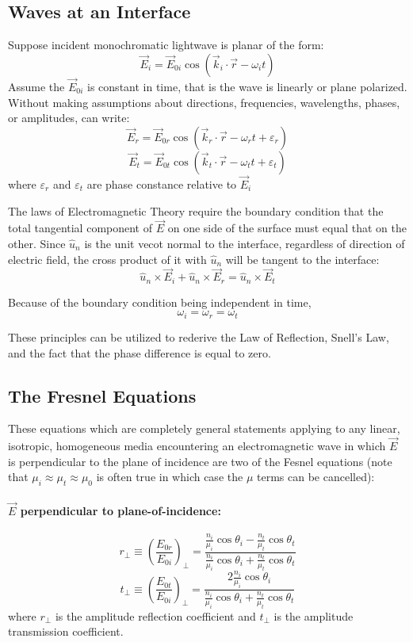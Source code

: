 \documentclass[12pt]{report}
\begin{document}
\subsection{Waves at an Interface}
Suppose incident monochromatic lightwave is planar of the form:
\[\vec{E}_i = \vec{E}_{0i}\cos (\vec{k}_i\cdot\vec{r}-\omega_i t)\]
Assume the $\vec{E}_{0i}$ is constant in time, that is the wave is linearly or plane polarized. Without making assumptions about directions, frequencies, wavelengths, phases, or amplitudes, can write:
\[\vec{E}_r = \vec{E}_{0r}\cos (\vec{k}_r\cdot\vec{r}-\omega_r t+\varepsilon_r)\]
\[\vec{E}_t = \vec{E}_{0t}\cos (\vec{k}_t\cdot\vec{r}-\omega_t t+\varepsilon_t)\]
where $\varepsilon_r$ and $\varepsilon_t$ are phase constance relative to $\vec{E}_i$

The laws of Electromagnetic Theory require the boundary condition that the total tangential component of $\vec{E}$ on one side of the surface must equal that on the other. Since $\hat{u}_n$ is the unit vecot normal to the interface, regardless of direction of electric field, the cross product of it with $\hat{u}_n$ will be tangent to the interface:
\[\hat{u}_n\times\vec{E}_i+\hat{u}_n\times\vec{E}_r = \hat{u}_n\times \vec{E}_t\]

Because of the boundary condition being independent in time,
\[\omega_i = \omega_r = \omega_t\]

These principles can be utilized to rederive the Law of Reflection, Snell's Law, and the fact that the phase difference is equal to zero. 
\subsection{The Fresnel Equations}
These equations which are completely general statements applying to any linear, isotropic, homogeneous media encountering an electromagnetic wave in which $\vec{E}$ is perpendicular to the plane of incidence are two of the Fesnel equations (note that $\mu_i \approx \mu_t \approx \mu_0$ is often true in which case the $\mu$ terms can be cancelled):
\paragraph{$\vec{E}$ perpendicular to plane-of-incidence:}
\begin{equation}
r_\perp \equiv \left(\frac{E_{0r}}{E_{0i}}\right)_\perp = \frac{\frac{n_i}{\mu_i}\cos \theta_i-\frac{n_t}{\mu_t}\cos \theta_t}{\frac{n_i}{\mu_i}\cos \theta_i+\frac{n_t}{\mu_t}\cos \theta_t}
\end{equation}
\begin{equation}
t_\perp \equiv \left(\frac{E_{0t}}{E_{0i}}\right)_\perp = \frac{2 \frac{n_i}{\mu_i}\cos \theta_i}{\frac{n_i}{\mu_i}\cos \theta_i+\frac{n_t}{\mu_t}\cos \theta_t}
\end{equation}
where $r_\perp$ is the amplitude reflection coefficient and $t_\perp$ is the amplitude transmission coefficient.
\end{document}
